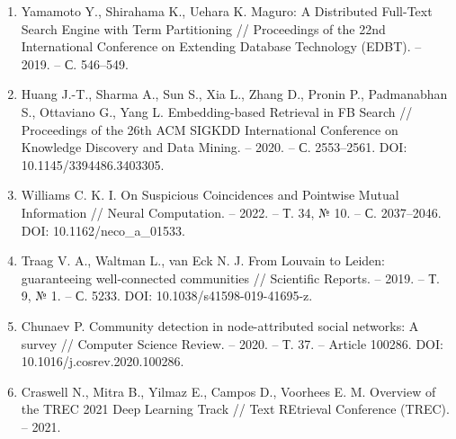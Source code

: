 \documentclass[14pt, a4paper]{article}
\begin{document}
\begin{enumerate}[wide=0pt, leftmargin=0pt, labelindent=\parindent, listparindent=\parindent, nosep, label=\arabic*]
		\item \hypertarget{src:i8}{} Yamamoto Y., Shirahama K., Uehara K. Maguro: A Distributed Full-Text Search Engine with Term Partitioning // Proceedings of the 22nd International Conference on Extending Database Technology (EDBT). -- 2019. -- С. 546--549.
		\item \hypertarget{src:i9}{} Huang J.-T., Sharma A., Sun S., Xia L., Zhang D., Pronin P., Padmanabhan S., Ottaviano G., Yang L. Embedding-based Retrieval in FB Search // Proceedings of the 26th ACM SIGKDD International Conference on Knowledge Discovery and Data Mining. -- 2020. -- С. 2553--2561. DOI: 10.1145/3394486.3403305.
		\item \hypertarget{src:i10}{} Williams C. K. I. On Suspicious Coincidences and Pointwise Mutual Information // Neural Computation. -- 2022. -- Т. 34, № 10. -- С. 2037--2046. DOI: 10.1162/neco\_a\_01533.
		\item \hypertarget{src:i11}{} Traag V. A., Waltman L., van Eck N. J. From Louvain to Leiden: guaranteeing well-connected communities // Scientific Reports. -- 2019. -- Т. 9, № 1. -- С. 5233. DOI: 10.1038/s41598-019-41695-z.
		\item \hypertarget{src:i12}{} Chunaev P. Community detection in node-attributed social networks: A survey // Computer Science Review. -- 2020. -- Т. 37. -- Article 100286. DOI: 10.1016/j.cosrev.2020.100286.
		\item \hypertarget{src:i13}{} Craswell N., Mitra B., Yilmaz E., Campos D., Voorhees E. M. Overview of the TREC 2021 Deep Learning Track // Text REtrieval Conference (TREC). -- 2021.
	\end{enumerate}

	
\end{document}
